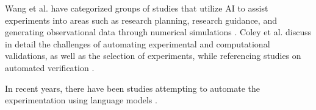 \documentclass{article}
\begin{document}
Wang et al. have categorized groups of studies that utilize AI to assist experiments into areas such as research planning, research guidance, and generating observational data through numerical simulations \cite{wang2023scientific}. Coley et al. discuss in detail the challenges of automating experimental and computational validations, as well as the selection of experiments, while referencing studies on automated verification \cite{coley2020autonomousII}.




In recent years, there have been studies attempting to automate the experimentation using language models \cite{boiko2023emergent,charness2023generation,qin2023gpt}.




\end{document}
